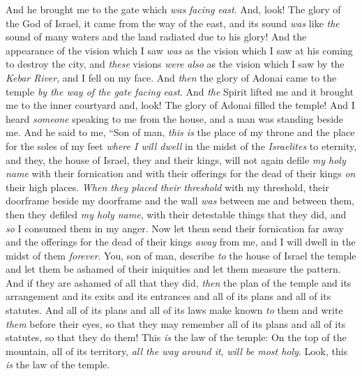 \begin{biblechapter} %
 And he brought me to the gate which \textit{was} \textit{facing east}.
\verse And, look! The glory of the God of Israel, it came from the way of the east, and its sound \textit{was} like \textit{the} sound of many waters and the land radiated due to his glory!
\verse And the appearance of the vision which I saw \textit{was} as the vision which I saw at his coming to destroy the city, and \textit{these} visions \textit{were} \textit{also} as the vision which I saw by the \textit{Kebar River}, and I fell on my face.
\verse And \textit{then} the glory of Adonai came to the temple \textit{by the way of the gate facing east}.
\verse And \textit{the} Spirit lifted me and it brought me to the inner courtyard and, look! The glory of Adonai filled the temple!
\verse And I heard \textit{someone} speaking to me from the house, and a man was standing beside me.
\verse And he said to me, “Son of man, \textit{this is} the place of my throne and the place for the soles of my feet \textit{where I will dwell} in the midst of the \textit{Israelites} to eternity, and they, the house of Israel, they and their kings, will not again defile \textit{my holy name} with their fornication and with their offerings for the dead of their kings \textit{on} their high places.
\verse \textit{When they placed their threshold} with my threshold, their doorframe beside my doorframe and the wall \textit{was} between me and between them, then they defiled \textit{my holy name}, with their detestable things that they did, and \textit{so} I consumed them in my anger.
\verse Now let them send their fornication far away and the offerings for the dead of their kings \textit{away} from me, and I will dwell in the midst of them \textit{forever}.
\verse You, son of man, describe \textit{to} the house of Israel the temple and let them be ashamed of their iniquities and let them measure the pattern.
\verse And if they are ashamed of all that they did, \textit{then} the plan of the temple and its arrangement and its exits and its entrances and all of its plans and all of its statutes. And all of its plans and all of its laws make known \textit{to} them and write \textit{them} before their eyes, so that they may remember all of its plans and all of its statutes, so that they do them!
\verse This \textit{is} the law of the temple: On the top of the mountain, all of its territory, \textit{all the way around it}, \textit{will be most holy}. Look, this \textit{is} the law of the temple.

\end{biblechapter}
